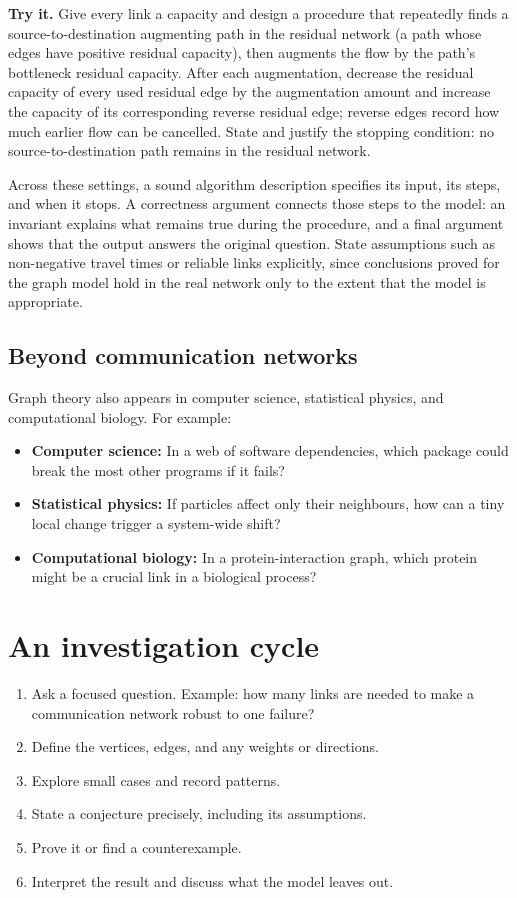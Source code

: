 \textbf{Try it.} Give every link a capacity and design a procedure that repeatedly finds a source-to-destination augmenting path in the residual network (a path whose edges have positive residual capacity), then augments the flow by the path's bottleneck residual capacity. After each augmentation, decrease the residual capacity of every used residual edge by the augmentation amount and increase the capacity of its corresponding reverse residual edge; reverse edges record how much earlier flow can be cancelled. State and justify the stopping condition: no source-to-destination path remains in the residual network.

Across these settings, a sound algorithm description specifies its input, its steps, and when it stops. A correctness argument connects those steps to the model: an invariant explains what remains true during the procedure, and a final argument shows that the output answers the original question. State assumptions such as non-negative travel times or reliable links explicitly, since conclusions proved for the graph model hold in the real network only to the extent that the model is appropriate.

\subsection{Beyond communication networks}
Graph theory also appears in computer science, statistical physics, and computational biology. For example:
\begin{itemize}
\item \textbf{Computer science:} In a web of software dependencies, which package could break the most other programs if it fails?
\item \textbf{Statistical physics:} If particles affect only their neighbours, how can a tiny local change trigger a system-wide shift?
\item \textbf{Computational biology:} In a protein-interaction graph, which protein might be a crucial link in a biological process?
\end{itemize}

\section{An investigation cycle}
\begin{enumerate}
\item Ask a focused question. Example: how many links are needed to make a communication network robust to one failure?
\item Define the vertices, edges, and any weights or directions.
\item Explore small cases and record patterns.
\item State a conjecture precisely, including its assumptions.
\item Prove it or find a counterexample.
\item Interpret the result and discuss what the model leaves out.
\end{enumerate}

